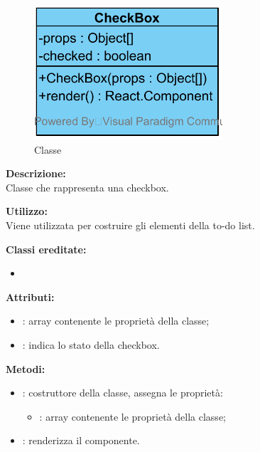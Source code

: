\paragraph[::CheckBox]{\class}\mbox{}\\ \label{\class}
\begin{figure}[H]
	\centering
	\includegraphics[width=7cm]{./diagrammi/framework/view/gui/checkbox.png}
	\caption{Classe \class}
\end{figure}
\textbf{Descrizione:}\\
Classe che rappresenta una checkbox.

\textbf{Utilizzo:}\\
Viene utilizzata per costruire gli elementi della to-do list.

\textbf{Classi ereditate:}
\begin{itemize}
	\item {}
\end{itemize}


\textbf{Attributi:}
\begin{itemize}
	\item {}: array contenente le proprietà della classe;
	\item {}: indica lo stato della checkbox.
\end{itemize}

\textbf{Metodi:}
\begin{itemize}
	\item {}: costruttore della classe, assegna le proprietà:
	\begin{itemize}
		\item {}: array contenente le proprietà della classe;
	\end{itemize}
	\item {}: renderizza il componente.
\end{itemize}

